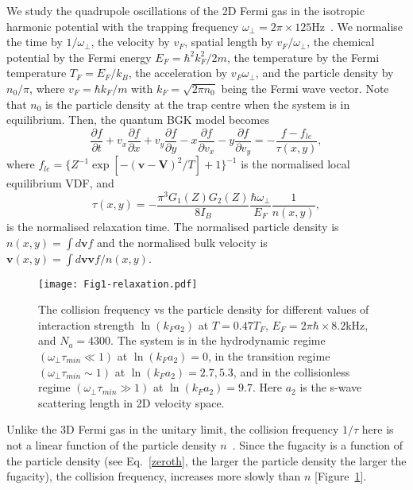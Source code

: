 We study the quadrupole oscillations of the 2D Fermi gas in the isotropic harmonic potential with the trapping frequency $\omega_\bot=2\pi\times125$Hz~\cite{Vogt2012}. We normalise the time by $1/\omega_\bot$,  the velocity by $v_F$, spatial length by $v_F/\omega_\bot$, the chemical potential by the Fermi energy $E_F=\hbar^2k_F^2/2m$, the temperature by the Fermi temperature $T_F=E_F/k_B$, the acceleration by $v_F\omega_\bot$, and the particle density by $n_0/\pi$, where $v_F=\hbar{k_F}/m$ with $k_F=\sqrt{2\pi{n_0}}$ being the Fermi wave vector. Note that $n_0$ is the particle density at the trap centre when the system is in equilibrium. Then, the quantum BGK model becomes
\begin{equation}\label{BGK}
    \frac{\partial f}{\partial t}+v_x \frac{\partial f}{\partial
    x}+v_y \frac{\partial f}{\partial
    y}-x\frac{\partial f}{\partial
    v_x}-y\frac{\partial
    f}{\partial v_y}=-\frac{f-f_{le}}{\tau(x,y)},
\end{equation}
where $f_{le}=\{Z^{-1}\exp[-(\textbf{v}-\textbf{V})^2/T]+1\}^{-1}$ is the normalised local equilibrium VDF,  and
\begin{equation}\label{relaxation}
    \tau(x,y)=-\frac{\pi^3G_1(Z)G_2(Z)}{8I_B}\frac{\hbar\omega_\bot}{E_F}\frac{1}{n(x,y)},
\end{equation}
is the normalised relaxation time. The normalised particle density is $n(x,y)=\int{d}\textbf{v} f$ and the normalised bulk velocity is $\textbf{v}(x,y)=\int{d}\textbf{v} \textbf{v}f/n(x,y)$.


\begin{figure}[t]
\centering
\texttt{[image: Fig1-relaxation.pdf]}
\caption[The collision frequency vs the particle density for different values of interaction strength $\ln(k_Fa_2)$ at $T=0.47T_F$, $E_F=2\pi\hbar\times8.2$kHz, and $N_a=4300$.]{ The collision frequency vs the particle density for different values of interaction strength $\ln(k_Fa_2)$ at $T=0.47T_F$, $E_F=2\pi\hbar\times8.2$kHz, and $N_a=4300$. The system is in the hydrodynamic regime $(\omega_\bot\tau_{min}\ll1)$ at $\ln(k_Fa_2)=0$, in the transition regime $(\omega_\bot\tau_{min}\sim1)$ at $\ln(k_Fa_2)=2.7, 5.3$, and in the collisionless regime $(\omega_\bot\tau_{min}\gg1)$ at $\ln(k_Fa_2)=9.7$. Here $a_2$ is the s-wave scattering length in 2D velocity space.}
\label{fig_relaxation}
\end{figure}

Unlike the 3D Fermi gas in the unitary limit, the collision frequency $1/\tau$ here is not a linear function of the particle density $n$~\cite{Massignan2005}. Since the fugacity is a function of the particle density (see Eq.~\eqref{zeroth}, the larger the particle density the larger the fugacity), the collision frequency, increases more slowly than $n$ [Figure~\ref{fig_relaxation}].

